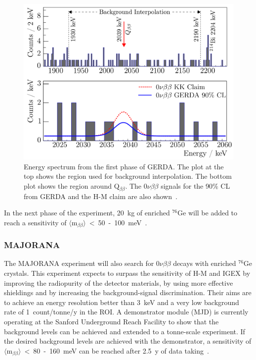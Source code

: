 \documentclass[main.tex]{subfiles}
\begin{document}
\begin{figure}[h!]
\begin{center}
\includegraphics[scale=0.3]{pictures/Chap2/GERDAresults.png}
\caption{Energy spectrum from the first phase of GERDA. The plot at the top shows the region used for background interpolation. The bottom plot shows the region around Q$_{\beta\beta}$. The 0$\nu\beta\beta$ signals for the 90\% CL from GERDA and the H-M claim are also shown~\cite{GERDA}.}
\label{GERDAresults}
\end{center}
\end{figure}


\NI In the next phase of the experiment, 20~kg of enriched $^{\text{76}}$Ge will be added to reach a sensitivity of $\langle \text{m}_{\beta\beta} \rangle$~<~50~-~100~meV~\cite{GERDAprospective}.


\FloatBarrier


\subsubsection{MAJORANA}


The MAJORANA experiment will also search for 0$\nu\beta\beta$ decays with enriched $^{\text{76}}$Ge crystals. This experiment expects to surpass the sensitivity of H-M and IGEX by improving the radiopurity of the detector materials, by using more effective shieldings and by increasing the background-signal discrimination. Their aims are to achieve an energy resolution better than 3~keV and a very low background rate of 1~count/tonne/y in the ROI. A demonstrator module (MJD) is currently operating at the Sanford Underground Reach Facility to show that the background levels can be achieved and extended to a tonne-scale experiment. If the desired background levels are achieved with the demonstrator, a sensitivity of $\langle \text{m}_{\beta\beta} \rangle$~<~80~-~160~meV can be reached after 2.5~y of data taking~\cite{MAJORANA}.
\end{document}
